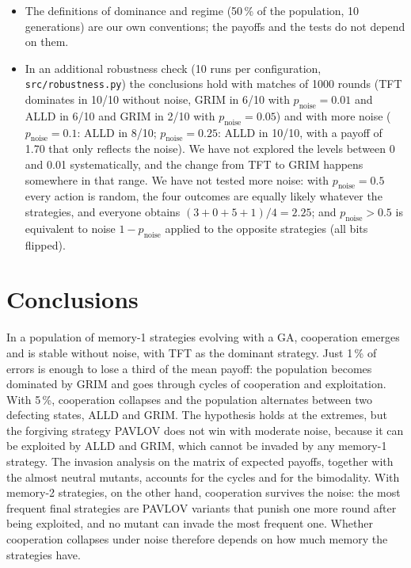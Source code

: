 \documentclass[10pt,a4paper]{article}
\newcommand{\pn}{p_{\text{noise}}}
\begin{document}
\begin{itemize}
        the payoff with the composition of the population.
  \item The definitions of dominance and regime (50\,\% of the population,
        10 generations) are our own conventions; the payoffs and the tests do not depend on them.
  \item In an additional robustness check (10 runs per configuration,
        \texttt{src/robustness.py}) the conclusions hold with matches of 1000 rounds (TFT dominates in
        10/10 without noise, GRIM in 6/10 with $\pn=0.01$ and ALLD in 6/10 and GRIM in 2/10 with $\pn=0.05$) and with more
        noise ($\pn=0.1$: ALLD in 8/10; $\pn=0.25$: ALLD in 10/10, with a payoff of 1.70 that only reflects
        the noise). We have not explored the levels between 0 and 0.01 systematically, and the change from
        TFT to GRIM happens somewhere in that range. We have not tested more noise: with $\pn=0.5$
        every action is random, the four outcomes are equally likely whatever the strategies, and everyone
        obtains $(3+0+5+1)/4=2.25$; and $\pn>0.5$ is equivalent to noise $1-\pn$ applied to the opposite
        strategies (all bits flipped).
\end{itemize}

\section{Conclusions}
In a population of memory-1 strategies evolving with a GA, cooperation emerges and is stable without noise,
with TFT as the dominant strategy. Just 1\,\% of errors is enough to lose a third of the mean payoff: the
population becomes dominated by GRIM and goes through cycles of cooperation and exploitation. With 5\,\%,
cooperation collapses and the population alternates between two defecting states, ALLD and GRIM. The
hypothesis holds at the extremes, but the forgiving strategy PAVLOV does not win with moderate noise,
because it can be exploited by ALLD and GRIM, which cannot be invaded by any memory-1 strategy. The invasion
analysis on the matrix of expected payoffs, together with the almost neutral mutants, accounts for the
cycles and for the bimodality.
With memory-2 strategies, on the other hand, cooperation survives the noise: the most frequent final
strategies are PAVLOV variants that punish one more round after being exploited, and no mutant can invade
the most frequent one. Whether
cooperation collapses under noise therefore depends on how much memory the strategies have.
\end{document}
